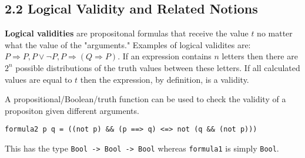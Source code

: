 \documentclass[11pt]{article}
\begin{document}
\subsection*{2.2 Logical Validity and Related Notions}

\textbf{Logical validities} are propositonal formulas that receive the value $t$ no matter what the value of the "arguments." Examples of logical validites are: $P \Rightarrow P, P \lor \lnot P, P \Rightarrow (Q \Rightarrow P)$.
If an expression contains $n$ letters then there are $2^n$ possible distributions of the truth values between these letters. If all calculated values are equal to $t$ then the expression, by definition, is a validity.

A propositional/Boolean/truth function can be used to check the validity of a propositon given different arguments. 

\begin{verbatim}
formula2 p q = ((not p) && (p ==> q) <=> not (q && (not p)))
\end{verbatim}

This has the type \texttt{Bool -> Bool -> Bool} whereas \texttt{formula1} is simply \texttt{Bool}.
\end{document}
